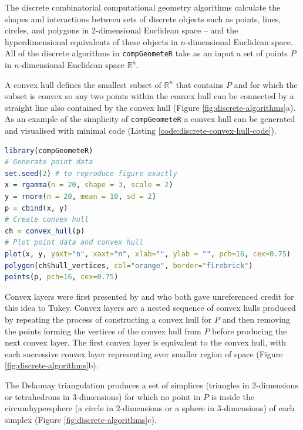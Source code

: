 \documentclass[12pt, a4paper]{article}
\begin{document}
The discrete combinatorial computational geometry algorithms calculate the shapes and interactions between sets of discrete objects such as points, lines, circles, and polygons in 2-dimensional Euclidean space -- and the hyperdimensional equivalents of these objects in $n$-dimensional Euclidean space.  All of the discrete algorithms in \texttt{compGeometeR} take as an input a set of points $P$ in $n$-dimensional Euclidean space $\mathbb{R}^n$.

A convex hull \citep{barber-1996} defines the smallest subset of $\mathbb{R}^n$ that contains $P$ and for which the subset is convex so any two points within the convex hull can be connected by a straight line also contained by the convex hull (Figure \ref{fig:discrete-algorithms}a).  As an example of the simplicity of \texttt{compGeometeR} a convex hull can be generated and visualised with minimal code (Listing \ref{code:discrete-convex-hull-code}).

\begin{lstlisting}[language=R, caption=Example \texttt{R} code to create a discrete convex hull (Figure \ref{fig:discrete-algorithms}a) with \texttt{compGeometeR}, label={code:discrete-convex-hull-code}]
library(compGeometeR)
# Generate point data
set.seed(2) # to reproduce figure exactly
x = rgamma(n = 20, shape = 3, scale = 2)
y = rnorm(n = 20, mean = 10, sd = 2)
p = cbind(x, y)
# Create convex hull
ch = convex_hull(p)
# Plot point data and convex hull
plot(x, y, yaxt="n", xaxt="n", xlab="", ylab = "", pch=16, cex=0.75)
polygon(ch$hull_vertices, col="orange", border="firebrick")
points(p, pch=16, cex=0.75)
\end{lstlisting}

Convex layers were first presented by \cite{huber-1972} and \cite{barnett-1976} who both gave unreferenced credit for this idea to Tukey.  Convex layers are a nested sequence of convex hulls produced by repeating the process of constructing a convex hull for $P$ and then removing the points forming the vertices of the convex hull from $P$ before producing the next convex layer.  The first convex layer is equivalent to the convex hull, with each successive convex layer representing ever smaller region of space (Figure \ref{fig:discrete-algorithms}b).

The Delaunay triangulation \citep{delaunay-1934} produces a set of simplices (triangles in 2-dimensions or tetrahedrons in 3-dimensions) for which no point in $P$ is inside the circumhypersphere (a circle in 2-dimensions or a sphere in 3-dimensions) of each simplex (Figure \ref{fig:discrete-algorithms}c).
\end{document}
